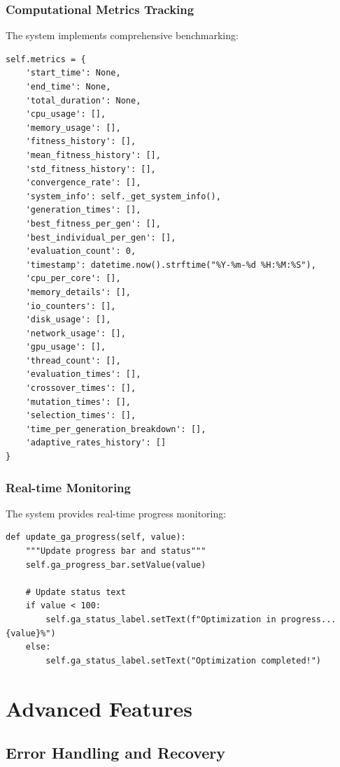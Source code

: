 \documentclass[12pt,a4paper]{article}
\begin{document}
\subsubsection{Computational Metrics Tracking}
The system implements comprehensive benchmarking:

\begin{lstlisting}[caption=Metrics Collection]
self.metrics = {
    'start_time': None,
    'end_time': None,
    'total_duration': None,
    'cpu_usage': [],
    'memory_usage': [],
    'fitness_history': [],
    'mean_fitness_history': [],
    'std_fitness_history': [],
    'convergence_rate': [],
    'system_info': self._get_system_info(),
    'generation_times': [],
    'best_fitness_per_gen': [],
    'best_individual_per_gen': [],
    'evaluation_count': 0,
    'timestamp': datetime.now().strftime("%Y-%m-%d %H:%M:%S"),
    'cpu_per_core': [],
    'memory_details': [],
    'io_counters': [],
    'disk_usage': [],
    'network_usage': [],
    'gpu_usage': [],
    'thread_count': [],
    'evaluation_times': [],
    'crossover_times': [],
    'mutation_times': [],
    'selection_times': [],
    'time_per_generation_breakdown': [],
    'adaptive_rates_history': []
}
\end{lstlisting}

\subsubsection{Real-time Monitoring}
The system provides real-time progress monitoring:

\begin{lstlisting}[caption=Progress Monitoring]
def update_ga_progress(self, value):
    """Update progress bar and status"""
    self.ga_progress_bar.setValue(value)
    
    # Update status text
    if value < 100:
        self.ga_status_label.setText(f"Optimization in progress... {value}%")
    else:
        self.ga_status_label.setText("Optimization completed!")
\end{lstlisting}

\section{Advanced Features}

\subsection{Error Handling and Recovery}
\end{document}
